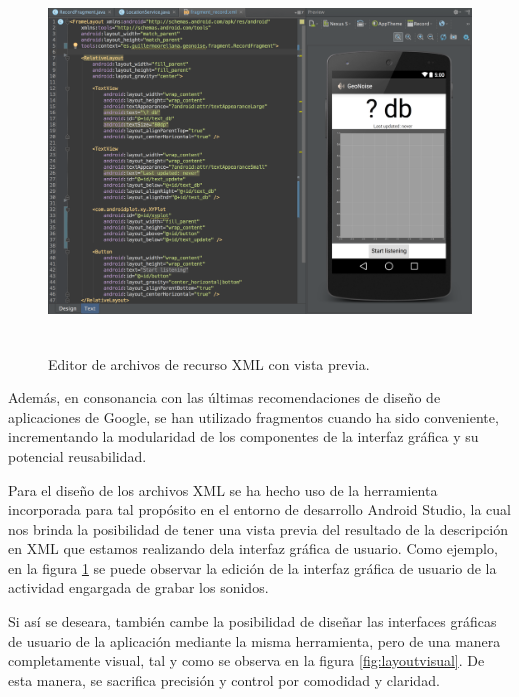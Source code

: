  \begin{figure}[hb] \centering
    \includegraphics[height=10cm]{graphs/layoutedit.png} \caption{Editor de archivos de recurso XML con vista previa.}\label{fig:layoutedit}
\end{figure}

Además, en consonancia con las últimas recomendaciones de diseño de aplicaciones de Google, se han utilizado fragmentos cuando ha sido conveniente, incrementando la modularidad de los componentes de la interfaz gráfica y su potencial reusabilidad.

Para el diseño de los archivos XML se ha hecho uso de la herramienta incorporada para tal propósito en el entorno de desarrollo Android Studio, la cual nos brinda la posibilidad de tener una vista previa del resultado de la descripción en XML que estamos realizando dela interfaz gráfica de usuario. Como ejemplo, en la figura \ref{fig:layoutedit} se puede observar la edición de la interfaz gráfica de usuario de la actividad engargada de grabar los sonidos.

Si así se deseara, también cambe la posibilidad de diseñar las interfaces gráficas de usuario de la aplicación mediante la misma herramienta, pero de una manera completamente visual, tal y como se observa en la figura \ref{fig:layoutvisual}. De esta manera, se sacrifica precisión y control por comodidad y claridad.

